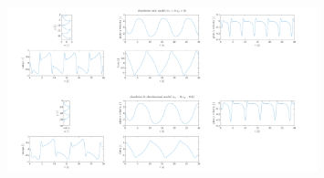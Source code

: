 \documentclass{jfm} %
\begin{document}
\begin{figure}
    \centering
    \includegraphics[angle=90,width=0.8\textwidth]{pics/g338.png}
    \label{fig:t_r_diagram_1}
\end{figure}

\textbf{}





\end{document}
